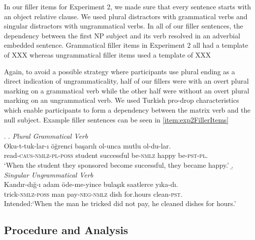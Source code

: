 \documentclass[doc,a4paper,man,natbib,floatsintext,noextraspace]{apa6}\usepackage[]{graphicx}\usepackage[]{color}
\begin{document}
In our filler items for Experiment 2, we made sure that every sentence starts with an object relative clause. We used plural distractors with grammatical verbs and singular distractors with ungrammatical verbs. In all of our filler sentences, the dependency between the first NP subject and its verb resolved in an adverbial embedded sentence. Grammatical filler items in Experiment 2 all had a template of
XXX
whereas ungrammatical filler items used a template of 
XXX

Again, to avoid a possible strategy where participants use plural ending as a direct indication of ungrammaticality, half of our fillers were with an overt plural marking on a grammatical verb while the other half were without an overt plural marking on an ungrammatical verb. We used Turkish pro-drop characteristics which enable participants to form a dependency between the matrix verb and the null subject. Example filler sentences can be seen in \ref{item:exp2FillerItems} 

\ex. \label{item:exp2FillerItems}
%
\a. \textit{Plural Grammatical Verb}\\ 
  \gll Oku-t-tuk-lar-ı öğrenci başarılı ol-unca mutlu ol-du-lar.\\ 
  read-\textsc{caus}-\textsc{nmlz}-\textsc{pl}-\textsc{poss}  student successful be-\textsc{nmlz} happy be-\textsc{pst}-\textsc{pl}.\\
  \glt `When the student they sponsored become successful, they became happy.' 
%
\b. \textit{Singular Ungrammatical Verb}\\ 
  \gll *Kandır-dığ-ı adam öde-me-yince bulaşık saatlerce yıka-dı.\\ 
  trick-\textsc{nmlz}-\textsc{poss}  man pay-\textsc{neg}-\textsc{nmlz} dish for.hours clean-\textsc{pst}.\\
  \glt Intended:`When the man he tricked did not pay, he cleaned dishes for hours.'


\subsection{Procedure and Analysis} \label{sec:exp2:procedure_analysis}





\end{document}
